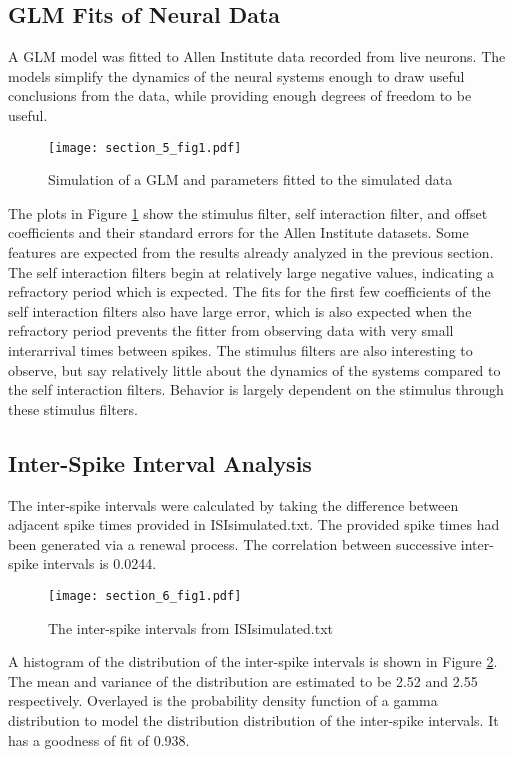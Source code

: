 \documentclass[letterpaper,titlepage,10pt]{article}
\begin{document}
\subsection{GLM Fits of Neural Data}

A GLM model was fitted to Allen Institute data recorded from live neurons. The models simplify the dynamics of the
neural systems enough to draw useful conclusions from the data, while providing enough degrees of freedom to be useful.

\begin{figure}[H]
\texttt{[image: section\_5\_fig1.pdf]}
\caption{Simulation of a GLM and parameters fitted to the simulated data}
\label{fig51}
\end{figure}

The plots in Figure \ref{fig51} show the stimulus filter, self interaction filter, and offset coefficients and their
standard errors for the Allen Institute datasets. Some features are expected from the results already analyzed in the
previous section. The self interaction filters begin at relatively large negative values, indicating a refractory
period which is expected. The fits for the first few coefficients of the self interaction filters also have large
error, which is also expected when the refractory period prevents the fitter from observing data with very small
interarrival times between spikes. The stimulus filters are also interesting to observe, but say relatively little
about the dynamics of the systems compared to the self interaction filters. Behavior is largely dependent on the
stimulus through these stimulus filters.

\subsection{Inter-Spike Interval Analysis}

The inter-spike intervals were calculated by taking the difference between adjacent spike times provided in
ISIsimulated.txt. The provided spike times had been generated via a renewal process. The correlation between
successive inter-spike intervals is 0.0244.

\begin{figure}[H]
\texttt{[image: section\_6\_fig1.pdf]}
\caption{The inter-spike intervals from ISIsimulated.txt}
\label{fig61}
\end{figure}

A histogram of the distribution of the inter-spike intervals is shown in Figure \ref{fig61}. The mean and variance of
the distribution are estimated to be 2.52 and 2.55 respectively. Overlayed is the probability density function of a
gamma distribution to model the distribution distribution of the inter-spike intervals. It has a goodness of fit of
0.938.
\end{document}
